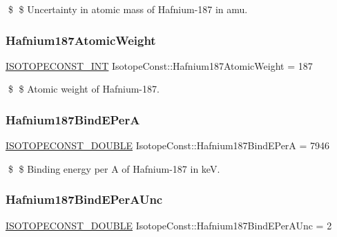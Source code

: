 \$ \$ Uncertainty in atomic mass of Hafnium-\/187 in amu. \mbox{\label{group___isotope_const-_hafnium-_hf187_gac3bade304cafa30e03ec25badee133be}} 
\subsubsection{\texorpdfstring{Hafnium187\+Atomic\+Weight}{Hafnium187AtomicWeight}}
{\footnotesize\ttfamily \mbox{\hyperlink{group___isotope_const-_macros_ga5f18360b3e99483a35c32d789e62621c}{I\+S\+O\+T\+O\+P\+E\+C\+O\+N\+S\+T\+\_\+\+I\+NT}} Isotope\+Const\+::\+Hafnium187\+Atomic\+Weight = 187}

\$ \$ Atomic weight of Hafnium-\/187. \mbox{\label{group___isotope_const-_hafnium-_hf187_gab258f6ce562710dbd7dc418d283a3086}} 
\subsubsection{\texorpdfstring{Hafnium187\+Bind\+E\+PerA}{Hafnium187BindEPerA}}
{\footnotesize\ttfamily \mbox{\hyperlink{group___isotope_const-_macros_ga8f45a7272ce02c0b4c65c44636ed719a}{I\+S\+O\+T\+O\+P\+E\+C\+O\+N\+S\+T\+\_\+\+D\+O\+U\+B\+LE}} Isotope\+Const\+::\+Hafnium187\+Bind\+E\+PerA = 7946}

\$ \$ Binding energy per A of Hafnium-\/187 in keV. \mbox{\label{group___isotope_const-_hafnium-_hf187_gabcf48213a7e1c36fca806b9692485c3f}} 
\subsubsection{\texorpdfstring{Hafnium187\+Bind\+E\+Per\+A\+Unc}{Hafnium187BindEPerAUnc}}
{\footnotesize\ttfamily \mbox{\hyperlink{group___isotope_const-_macros_ga8f45a7272ce02c0b4c65c44636ed719a}{I\+S\+O\+T\+O\+P\+E\+C\+O\+N\+S\+T\+\_\+\+D\+O\+U\+B\+LE}} Isotope\+Const\+::\+Hafnium187\+Bind\+E\+Per\+A\+Unc = 2}

